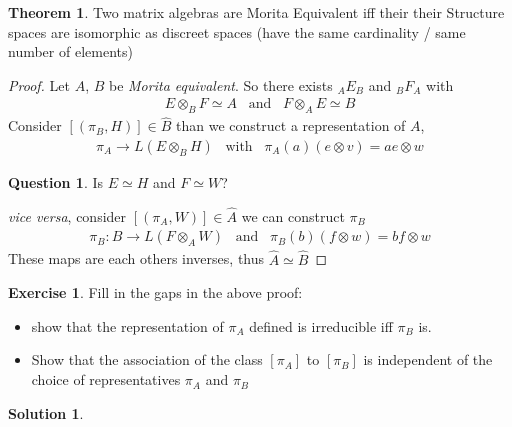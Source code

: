 \documentclass[a4paper]{article}
\theoremstyle{definition}
\theoremstyle{definition}
\newtheorem{question}{Question}
\theoremstyle{definition}
\theoremstyle{theorem}
\newtheorem{theorem}{Theorem}
\theoremstyle{theorem}
\newtheorem{exercise}{Exercise}
\theoremstyle{theorem}
\theoremstyle{definition}
\newtheorem{solution}{Solution}
\begin{document}
\begin{theorem}
    Two matrix algebras are Morita Equivalent iff their their Structure spaces
    are isomorphic as discreet spaces (have the same cardinality / same number of elements)
\end{theorem}
\begin{proof}
    Let $A$, $B$ be \textit{Morita equivalent}. So there exists $_A E_B$ and $_B F_A$ with
    \begin{align*}
        E \otimes _B F \simeq A \;\;\; \text{and} \;\;\; F \otimes _A E \simeq B
    \end{align*}
    Consider $[(\pi _B, H)] \in \hat{B}$ than we construct a representation of $A$,
    \begin{align*}
        \pi _A \rightarrow L(E \otimes _B H)\;\;\; \text{with} \;\;\; \pi _A(a) (e \otimes v) = a e \otimes w
    \end{align*}
    \begin{question}
        Is $E \simeq H$ and $F \simeq W$?
    \end{question}
    \textit{vice versa}, consider $[(\pi _A, W)] \in \hat{A}$ we can construct $\pi _B$
    \begin{align*}
        \pi _B: B \rightarrow L(F \otimes _A W) \;\;\; \text{and}\;\;\; \pi _B(b) (f\otimes w) = bf\otimes w
    \end{align*}
    These maps are each others inverses, thus $\hat{A} \simeq \hat{B}$
\end{proof}

\begin{exercise}
    Fill in the gaps in the above proof:
    \begin{itemize}
        \item show that the representation of $\pi _A$ defined is irreducible iff $\pi _B$ is.
        \item Show that the association of the class $[\pi _A]$ to $[\pi _B]$ is independent
            of the choice of representatives $\pi _A$ and $\pi _B$
    \end{itemize}
\end{exercise}

\begin{solution}
\end{solution}
\end{document}
